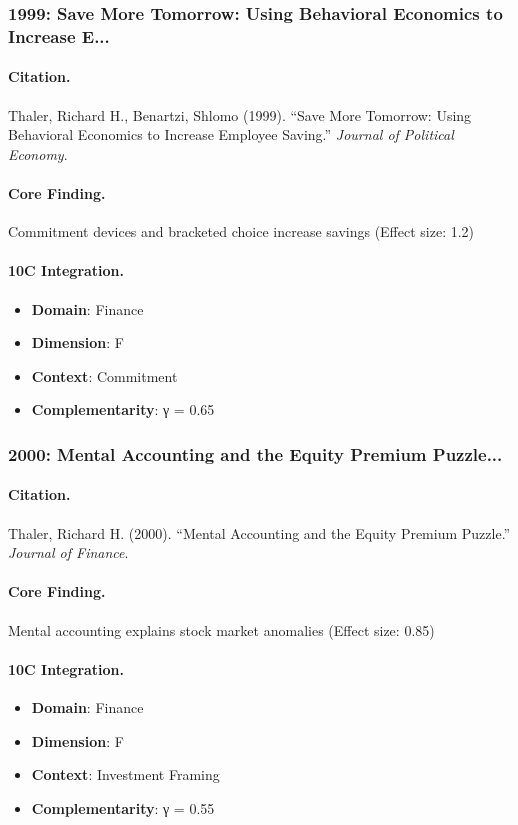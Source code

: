 \subsubsection{1999: Save More Tomorrow: Using Behavioral Economics to Increase E...}

\paragraph{Citation.}
Thaler, Richard H., Benartzi, Shlomo (1999). ``Save More Tomorrow: Using Behavioral Economics to Increase Employee Saving.''
\textit{Journal of Political Economy}.

\paragraph{Core Finding.}
Commitment devices and bracketed choice increase savings (Effect size: 1.2)

\paragraph{10C Integration.}
\begin{itemize}[nosep]
  \item \textbf{Domain}: Finance
  \item \textbf{Dimension}: F
  \item \textbf{Context}: Commitment
  \item \textbf{Complementarity}: γ = 0.65
\end{itemize}

\subsubsection{2000: Mental Accounting and the Equity Premium Puzzle...}

\paragraph{Citation.}
Thaler, Richard H. (2000). ``Mental Accounting and the Equity Premium Puzzle.''
\textit{Journal of Finance}.

\paragraph{Core Finding.}
Mental accounting explains stock market anomalies (Effect size: 0.85)

\paragraph{10C Integration.}
\begin{itemize}[nosep]
  \item \textbf{Domain}: Finance
  \item \textbf{Dimension}: F
  \item \textbf{Context}: Investment Framing
  \item \textbf{Complementarity}: γ = 0.55
\end{itemize}

